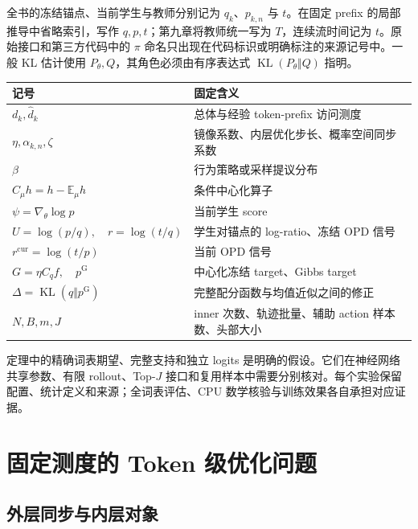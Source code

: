 \documentclass[lang=cn,scheme=chinese,openany]{../book/elegantbook}
\newcommand{\E}{\mathbb E}
\newcommand{\KL}{\operatorname{KL}}
\begin{document}
全书的冻结锚点、当前学生与教师分别记为 $q_k$、$p_{k,n}$ 与 $t$。在固定 prefix 的局部推导中省略索引，写作 $q,p,t$；第九章将教师统一写为 $T$，连续流时间记为 $t$。原始接口和第三方代码中的 $\pi$ 命名只出现在代码标识或明确标注的来源记号中。一般 KL 估计使用 $P_\theta,Q$，其角色必须由有序表达式 $\KL(P_\theta\Vert Q)$ 指明。

\begin{center}
\begin{tabular}{ll}
\toprule
记号 & 固定含义\\
\midrule
$d_k,\widehat d_k$ & 总体与经验 token-prefix 访问测度\\
$\eta,\alpha_{k,n},\zeta$ & 镜像系数、内层优化步长、概率空间同步系数\\
$\beta$ & 行为策略或采样提议分布\\
$C_\mu h=h-\E_\mu h$ & 条件中心化算子\\
$\psi=\nabla_\theta\log p$ & 当前学生 score\\
$U=\log(p/q),\quad r=\log(t/q)$ & 学生对锚点的 log-ratio、冻结 OPD 信号\\
$r^{\mathrm{cur}}=\log(t/p)$ & 当前 OPD 信号\\
$G=\eta C_q f,\quad p^{\mathrm G}$ & 中心化冻结 target、Gibbs target\\
$\Delta=\KL(q\Vert p^{\mathrm G})$ & 完整配分函数与均值近似之间的修正\\
$N,B,m,J$ & inner 次数、轨迹批量、辅助 action 样本数、头部大小\\
\bottomrule
\end{tabular}
\end{center}

定理中的精确词表期望、完整支持和独立 logits 是明确的假设。它们在神经网络共享参数、有限 rollout、Top-$J$ 接口和复用样本中需要分别核对。每个实验保留配置、统计定义和来源；全词表评估、CPU 数学核验与训练效果各自承担对应证据。


\tableofcontents
\mainmatter


\chapter{固定测度的 Token 级优化问题}

\section{外层同步与内层对象}
\end{document}
